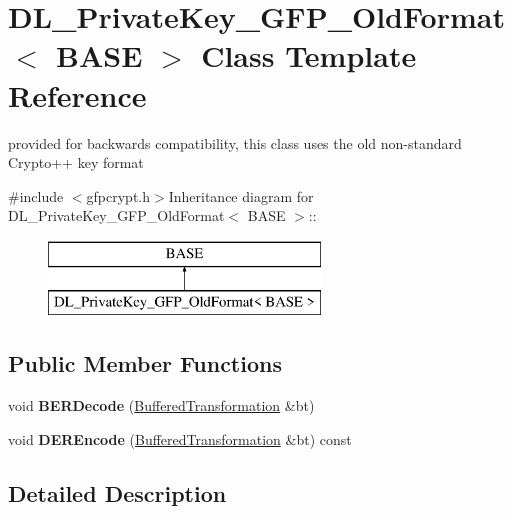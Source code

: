 \hypertarget{class_d_l___private_key___g_f_p___old_format}{
\section{DL\_\-PrivateKey\_\-GFP\_\-OldFormat$<$ BASE $>$ Class Template Reference}
\label{class_d_l___private_key___g_f_p___old_format}
}


provided for backwards compatibility, this class uses the old non-\/standard Crypto++ key format  


{\ttfamily \#include $<$gfpcrypt.h$>$}Inheritance diagram for DL\_\-PrivateKey\_\-GFP\_\-OldFormat$<$ BASE $>$::\begin{figure}[H]
\begin{center}
\leavevmode
\includegraphics[height=2cm]{class_d_l___private_key___g_f_p___old_format}
\end{center}
\end{figure}
\subsection*{Public Member Functions}
\begin{DoxyCompactItemize}
\item 
\hypertarget{class_d_l___private_key___g_f_p___old_format_a6ed1183e0580ca84f0d2cfa37a5b144f}{
void {\bfseries BERDecode} (\hyperlink{class_buffered_transformation}{BufferedTransformation} \&bt)}
\label{class_d_l___private_key___g_f_p___old_format_a6ed1183e0580ca84f0d2cfa37a5b144f}

\item 
\hypertarget{class_d_l___private_key___g_f_p___old_format_a896aa0d3eddea4c1308b92e6e114869c}{
void {\bfseries DEREncode} (\hyperlink{class_buffered_transformation}{BufferedTransformation} \&bt) const }
\label{class_d_l___private_key___g_f_p___old_format_a896aa0d3eddea4c1308b92e6e114869c}

\end{DoxyCompactItemize}


\subsection{Detailed Description}

